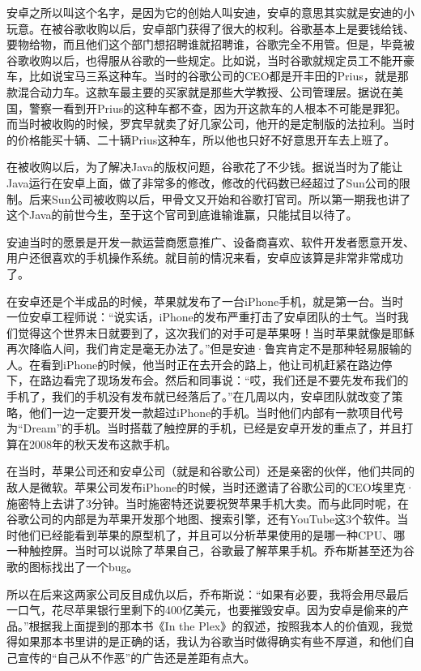 \documentclass[
  letterpaper,
  DIV=11,
  numbers=noendperiod]{scrreprt}
\begin{document}
安卓之所以叫这个名字，是因为它的创始人叫安迪，安卓的意思其实就是安迪的小玩意。在被谷歌收购以后，安卓部门获得了很大的权利。谷歌基本上是要钱给钱、要物给物，而且他们这个部门想招聘谁就招聘谁，谷歌完全不用管。但是，毕竟被谷歌收购以后，也得服从谷歌的一些规定。比如说，当时谷歌就规定员工不能开豪车，比如说宝马三系这种车。当时的谷歌公司的CEO都是开丰田的Prius，就是那款混合动力车。这款车最主要的买家就是那些大学教授、公司管理层。据说在美国，警察一看到开Prius的这种车都不查，因为开这款车的人根本不可能是罪犯。而当时被收购的时候，罗宾早就卖了好几家公司，他开的是定制版的法拉利。当时的价格能买十辆、二十辆Prius这种车，所以他也只好不好意思开车去上班了。

在被收购以后，为了解决Java的版权问题，谷歌花了不少钱。据说当时为了能让Java运行在安卓上面，做了非常多的修改，修改的代码数已经超过了Sun公司的限制。后来Sun公司被收购以后，甲骨文又开始和谷歌打官司。所以第一期我也讲了这个Java的前世今生，至于这个官司到底谁输谁赢，只能拭目以待了。

安迪当时的愿景是开发一款运营商愿意推广、设备商喜欢、软件开发者愿意开发、用户还很喜欢的手机操作系统。就目前的情况来看，安卓应该算是非常非常成功了。

在安卓还是个半成品的时候，苹果就发布了一台iPhone手机，就是第一台。当时一位安卓工程师说：``说实话，iPhone的发布严重打击了安卓团队的士气。当时我们觉得这个世界末日就要到了，这次我们的对手可是苹果呀！当时苹果就像是耶稣再次降临人间，我们肯定是毫无办法了。''但是安迪·鲁宾肯定不是那种轻易服输的人。在看到iPhone的时候，他当时正在去开会的路上，他让司机赶紧在路边停下，在路边看完了现场发布会。然后和同事说：``哎，我们还是不要先发布我们的手机了，我们的手机没有发布就已经落后了。''在几周以内，安卓团队就改变了策略，他们一边一定要开发一款超过iPhone的手机。当时他们内部有一款项目代号为``Dream''的手机。当时搭载了触控屏的手机，已经是安卓开发的重点了，并且打算在2008年的秋天发布这款手机。

在当时，苹果公司还和安卓公司（就是和谷歌公司）还是亲密的伙伴，他们共同的敌人是微软。苹果公司发布iPhone的时候，当时还邀请了谷歌公司的CEO埃里克·施密特上去讲了3分钟。当时施密特还说要祝贺苹果手机大卖。而与此同时呢，在谷歌公司的内部是为苹果开发那个地图、搜索引擎，还有YouTube这3个软件。当时他们已经能看到苹果的原型机了，并且可以分析苹果使用的是哪一种CPU、哪一种触控屏。当时可以说除了苹果自己，谷歌最了解苹果手机。乔布斯甚至还为谷歌的图标找出了一个bug。

所以在后来这两家公司反目成仇以后，乔布斯说：``如果有必要，我将会用尽最后一口气，花尽苹果银行里剩下的400亿美元，也要摧毁安卓。因为安卓是偷来的产品。''根据我上面提到的那本书《In
the
Plex》的叙述，按照我本人的价值观，我觉得如果那本书里讲的是正确的话，我认为谷歌当时做得确实有些不厚道，和他们自己宣传的``自己从不作恶''的广告还是差距有点大。
\end{document}
